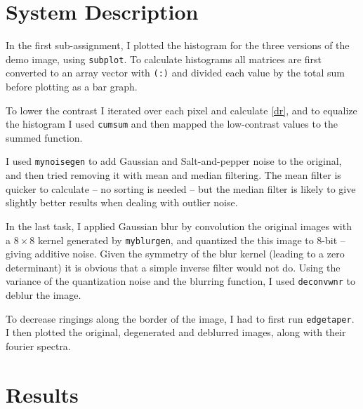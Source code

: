 \documentclass[a4paper]{article}
\begin{document}

\section{System Description}
\label{sec:system}
In the first sub-assignment, I plotted the histogram for the three versions of the demo image, using \texttt{subplot}. To calculate histograms all matrices are first converted to an array vector with \texttt{(:)} and divided each value by the total sum before plotting as a bar graph.

To lower the contrast I iterated over each pixel and calculate \eqref{dr}, and to equalize the histogram I used \texttt{cumsum} and then mapped the low-contrast values to the summed function.

I used \texttt{mynoisegen} to add Gaussian and Salt-and-pepper noise to the original, and then tried removing it with mean and median filtering. The mean filter is quicker to calculate -- no sorting is needed -- but the median filter is likely to give slightly better results when dealing with outlier noise.

In the last task, I applied Gaussian blur by convolution the original images with a $8\times8$ kernel generated by \texttt{myblurgen}, and quantized the this image to 8-bit -- giving additive noise. Given the symmetry of the blur kernel (leading to a zero determinant) it is obvious that a simple inverse filter would not do. Using the variance of the quantization noise and the blurring function, I used \texttt{deconvwnr} to deblur the image.

To decrease ringings along the border of the image, I had to first run \texttt{edgetaper}. I then plotted the original, degenerated and deblurred images, along with their fourier spectra.

\section{Results}
\label{sec:results}
\end{document}
